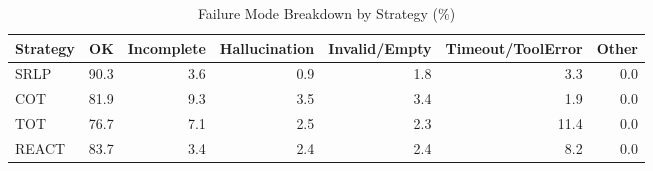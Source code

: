 \begin{table}[htbp]
\centering
\caption{Failure Mode Breakdown by Strategy (\%)}
\label{tab:error_breakdown}
\begin{tabular}{lrrrrrr}
\toprule
Strategy & OK & Incomplete & Hallucination & Invalid/Empty & Timeout/ToolError & Other \\
\midrule
SRLP & 90.3 & 3.6 & 0.9 & 1.8 & 3.3 & 0.0 \\
COT & 81.9 & 9.3 & 3.5 & 3.4 & 1.9 & 0.0 \\
TOT & 76.7 & 7.1 & 2.5 & 2.3 & 11.4 & 0.0 \\
REACT & 83.7 & 3.4 & 2.4 & 2.4 & 8.2 & 0.0 \\
\bottomrule
\end{tabular}
\end{table}